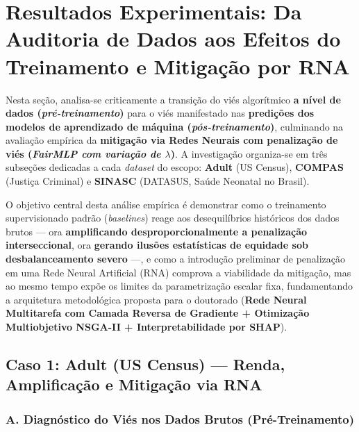 
\section{Resultados Experimentais: Da Auditoria de Dados aos Efeitos do Treinamento e Mitigação por RNA}
\label{sec:resultados_pre_vs_pos}

Nesta seção, analisa-se criticamente a transição do viés algorítmico \textbf{a nível de dados (\textit{pré-treinamento})} para o viés manifestado nas \textbf{predições dos modelos de aprendizado de máquina (\textit{pós-treinamento})}, culminando na avaliação empírica da \textbf{mitigação via Redes Neurais com penalização de viés (\textit{FairMLP com variação de $\lambda$})}. A investigação organiza-se em três subseções dedicadas a cada \textit{dataset} do escopo: \textbf{Adult} (US Census), \textbf{COMPAS} (Justiça Criminal) e \textbf{SINASC} (DATASUS, Saúde Neonatal no Brasil).

O objetivo central desta análise empírica é demonstrar como o treinamento supervisionado padrão (\textit{baselines}) reage aos desequilíbrios históricos dos dados brutos --- ora \textbf{amplificando desproporcionalmente a penalização interseccional}, ora \textbf{gerando ilusões estatísticas de equidade sob desbalanceamento severo} ---, e como a introdução preliminar de penalização em uma Rede Neural Artificial (RNA) comprova a viabilidade da mitigação, mas ao mesmo tempo expõe os limites da parametrização escalar fixa, fundamentando a arquitetura metodológica proposta para o doutorado (\textbf{Rede Neural Multitarefa com Camada Reversa de Gradiente + Otimização Multiobjetivo NSGA-II + Interpretabilidade por SHAP}).

\subsection{Caso 1: Adult (US Census) --- Renda, Amplificação e Mitigação via RNA}
\label{subsec:caso_adult}

\subsubsection{A. Diagnóstico do Viés nos Dados Brutos (Pré-Treinamento)}


